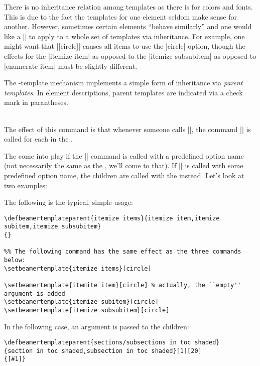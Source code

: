 There is no inheritance relation among templates as there is for
colors and fonts. This is due to the fact the templates for one
element seldom make sense for another. However, sometimes certain
elements ``behave similarly'' and one would like a
|\setbeamertemplate| to apply to a whole set of templates via
inheritance. For example, one might want that
|[circle]| causes all items to use the
|circle| option, though the effects for the |itemize item| as opposed
to the |itemize subsubitem| as opposed to |enumerate item| must be
slightly different.

The \beamer-template mechanism implements a simple form of inheritance
via \emph{parent templates}. In element descriptions, parent templates
are indicated via a check mark in parantheses.

\begin{command}{\\
}
  The effect of this command is that whenever someone calls
  ||,
  the command || is called for each  in the .

  The  come into play if the
  |\setbeamertemplate| command is called with a predefined option name
  (not necessarily the same as the ,
  we'll come to that). If |\setbeamertemplate| is called with some
  predefined option name, the children are called with the
   instead. Let's look at two examples:
  
  \example The following is the typical, simple usage:
\begin{verbatim}
\defbeamertemplateparent{itemize items}{itemize item,itemize subitem,itemize subsubitem}
{}

%% The following command has the same effect as the three commands below:
\setbeamertemplate{itemize items}[circle]

\setbeamertemplate{itemite item}[circle] % actually, the ``empty'' argument is added
\setbeamertemplate{itemize subitem}[circle]
\setbeamertemplate{itemize subsubitem}[circle]
\end{verbatim}

  \example In the following case, an argument is passed to the
  children:
\begin{verbatim}
\defbeamertemplateparent{sections/subsections in toc shaded}
{section in toc shaded,subsection in toc shaded}[1][20]
{[#1]}


\end{verbatim}
\end{command}
